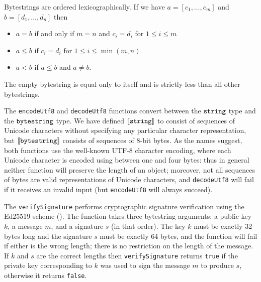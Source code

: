\label{note:bytestring-comparison}
Bytestrings are ordered lexicographically.  If we have $a = [c_1, \ldots, c_m]$
and $b = [d_1, \ldots, d_n]$ then
\begin{itemize}
\item $a = b$ if and only if $m=n$ and $c_i = d_i$ for $1 \leq i \leq m$
\item $a \leq b$ if $c_i = d_i$ for $1 \leq i \leq \min(m,n)$
\item $a<b$ if $a \leq b$ and $a \neq b$.
\end{itemize}
\noindent The empty bytestring is equal only to itself and is strictly less than all other bytestrings.


\label{note:bytestring-encoding}
The \texttt{encodeUtf8} and \texttt{decodeUtf8} functions convert between the
$\mathtt{string}$ type and the $\mathtt{bytestring}$ type.  We have defined
$\llbracket\mathit{\mathtt{string}}\rrbracket$ to consist of sequences of Unicode characters without
specifying any particular character representation, but
$\llbracket\mathit{\mathtt{bytestring}}\rrbracket$ consists of sequences of 8-bit bytes.  As the names
suggest, both functions use the well-known UTF-8 character encoding, where each
Unicode character is encoded using between one and four bytes: thus in general
neither function will preserve the length of an object; moreover, not all
sequences of bytes are valid representations of Unicode characters, and
\texttt{decodeUtf8} will fail if it receives an invalid input (but
\texttt{encodeUtf8} will always succeed).



\label{note:signature-verification}
The \texttt{verifySignature} performs cryptographic signature verification using
the Ed25519 scheme (\cite{ches-2011-24091}).  The function takes three bytestring
arguments: a public key $k$, a message $m$, and a signature $s$ (in that order).
The key $k$ must be exactly 32 bytes long and the signature $s$ must be exactly 64
bytes, and the function will fail if either is the wrong length; there is no
restriction on the length of the message. If $k$ and $s$ are the correct lengths
then \texttt{verifySignature} returns \texttt{true} if the private key
corresponding to $k$ was used to sign the message $m$ to produce $s$, otherwise
it returns \texttt{false}.


